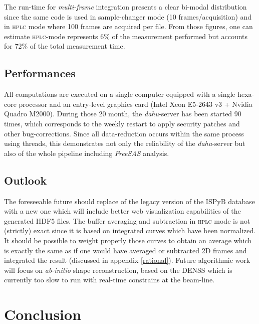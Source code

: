 \documentclass[preprint]{iucr}              %
\begin{document}
The run-time for \textit{multi-frame} integration presents a clear bi-modal distribution since the same code is used in sample-changer mode (10 frames/acquisition) and in \textsc{hplc} mode where 100 frames are acquired per file.
From those figures, one can estimate \textsc{hplc}-mode represents 6\% of the measurement performed but accounts for 72\% of the total measurement time.

\subsection{Performances}

All computations are executed on a single computer equipped with a single hexa-core processor and an entry-level graphics card (Intel Xeon E5-2643 v3 + Nvidia Quadro M2000). 
During those 20 month, the \textit{dahu}-server has been started 90 times, which corresponds to the weekly restart to apply security patches and other bug-corrections. 
Since all data-reduction occurs within the same process using threads, this demonstrates not only the reliability of the \textit{dahu}-server 
but also of the whole pipeline including \textit{FreeSAS} analysis.
\subsection{Outlook}

The foreseeable future should replace of the legacy version of the ISPyB database with a new one which will include better web visualization capabilities of the generated HDF5 files.
The buffer averaging and subtraction in \textsc{hplc} mode is not (strictly) exact since it is based on integrated curves which have been normalized.
It should be possible to weight properly those curves to obtain an average which is exactly the same as if one would have averaged or subtracted 2D frames and integrated the result (discussed in appendix \ref{rational}).
Future algorithmic work will focus on \textit{ab-initio} shape reconstruction, based on the DENSS \cite{denss} which is currently too slow to run with real-time constrains at the beam-line.

\section{Conclusion}
\end{document}
